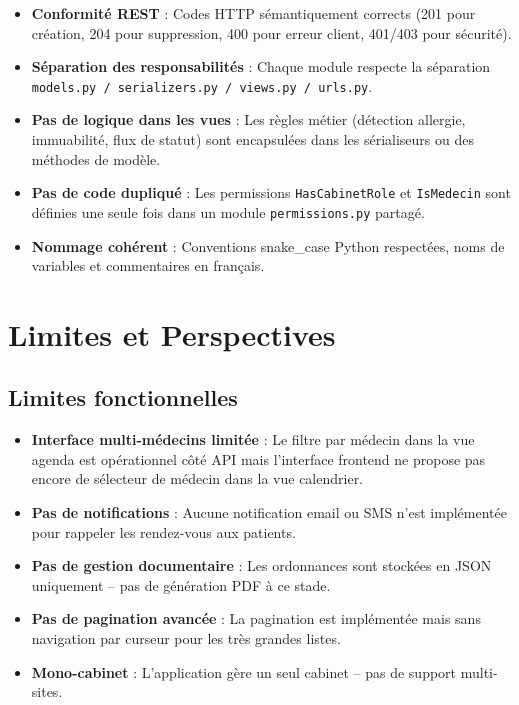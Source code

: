 \documentclass[12pt,a4paper]{report}
\begin{document}
\begin{itemize}[leftmargin=*]
  \item \textbf{Conformité REST} : Codes HTTP sémantiquement corrects (201 pour création, 204 pour suppression, 400 pour erreur client, 401/403 pour sécurité).
  \item \textbf{Séparation des responsabilités} : Chaque module respecte la séparation \texttt{models.py / serializers.py / views.py / urls.py}.
  \item \textbf{Pas de logique dans les vues} : Les règles métier (détection allergie, immuabilité, flux de statut) sont encapsulées dans les sérialiseurs ou des méthodes de modèle.
  \item \textbf{Pas de code dupliqué} : Les permissions \texttt{HasCabinetRole} et \texttt{IsMedecin} sont définies une seule fois dans un module \texttt{permissions.py} partagé.
  \item \textbf{Nommage cohérent} : Conventions snake\_case Python respectées, noms de variables et commentaires en français.
\end{itemize}

\chapter{Limites et Perspectives}

\section{Limites fonctionnelles}

\begin{itemize}[leftmargin=*]
  \item \textbf{Interface multi-médecins limitée} : Le filtre par médecin dans la vue agenda est opérationnel côté API mais l'interface frontend ne propose pas encore de sélecteur de médecin dans la vue calendrier.
  \item \textbf{Pas de notifications} : Aucune notification email ou SMS n'est implémentée pour rappeler les rendez-vous aux patients.
  \item \textbf{Pas de gestion documentaire} : Les ordonnances sont stockées en JSON uniquement -- pas de génération PDF à ce stade.
  \item \textbf{Pas de pagination avancée} : La pagination est implémentée mais sans navigation par curseur pour les très grandes listes.
  \item \textbf{Mono-cabinet} : L'application gère un seul cabinet -- pas de support multi-sites.
\end{itemize}
\end{document}
